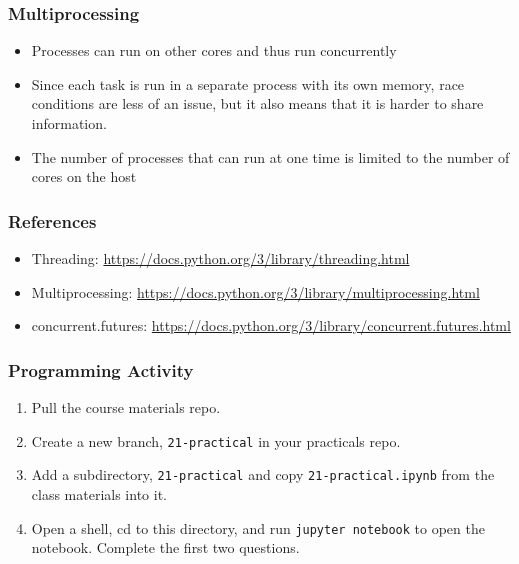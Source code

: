 \documentclass[10pt]{beamer}
\begin{document}
\begin{frame}
  \frametitle{Multiprocessing}
  
  \begin{itemize}
    \item Processes can run on other cores and thus run concurrently
    \item Since each task is run in a separate process with its own memory, race 
    conditions are less of an issue, but it also means that it is harder to share information.
    \item The number of processes that can run at one time is limited to the number of cores 
    on the host
  \end{itemize}      
\end{frame}


\begin{frame}
  \frametitle{References}
  
  \begin{itemize}
    \item Threading: \url{https://docs.python.org/3/library/threading.html}
    \item Multiprocessing: \url{https://docs.python.org/3/library/multiprocessing.html}
    \item concurrent.futures: 
    \url{https://docs.python.org/3/library/concurrent.futures.html}
   \end{itemize}      
\end{frame}


  

\begin{frame}
  \frametitle{Programming Activity}
  
  \begin{enumerate}
    \item Pull the course materials repo.
    \item Create a new branch, \texttt{21-practical} in your practicals repo.
    \item Add a subdirectory,  \texttt{21-practical} and copy \texttt{21-practical.ipynb} from the class materials into it.
    \item Open a shell, cd to this directory, and run \texttt{jupyter notebook} to open the notebook. Complete the first two questions.
  \end{enumerate}      
\end{frame}
  
\end{document}
